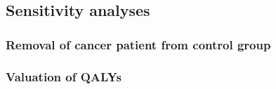 \subsection{Sensitivity analyses}

\subsubsection{Removal of cancer patient from control group}

\subsubsection{Valuation of QALYs}

